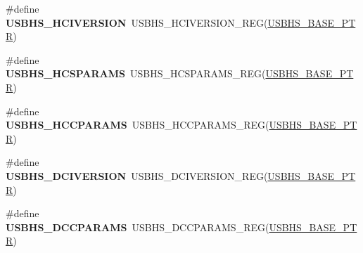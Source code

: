 \begin{DoxyCompactItemize}
\item 
\hypertarget{group___u_s_b_h_s___register___accessor___macros_ga67afc07e4a7744e0abad94d73dd6fe42}{}\#define {\bfseries U\+S\+B\+H\+S\+\_\+\+H\+C\+I\+V\+E\+R\+S\+I\+O\+N}~U\+S\+B\+H\+S\+\_\+\+H\+C\+I\+V\+E\+R\+S\+I\+O\+N\+\_\+\+R\+E\+G(\hyperlink{group___u_s_b_h_s___peripheral_gaa2bc10b8cd66f96acd39e15b3a581306}{U\+S\+B\+H\+S\+\_\+\+B\+A\+S\+E\+\_\+\+P\+T\+R})\label{group___u_s_b_h_s___register___accessor___macros_ga67afc07e4a7744e0abad94d73dd6fe42}

\item 
\hypertarget{group___u_s_b_h_s___register___accessor___macros_ga3e8dc34e06b4262bcc107bef2ee9ab3f}{}\#define {\bfseries U\+S\+B\+H\+S\+\_\+\+H\+C\+S\+P\+A\+R\+A\+M\+S}~U\+S\+B\+H\+S\+\_\+\+H\+C\+S\+P\+A\+R\+A\+M\+S\+\_\+\+R\+E\+G(\hyperlink{group___u_s_b_h_s___peripheral_gaa2bc10b8cd66f96acd39e15b3a581306}{U\+S\+B\+H\+S\+\_\+\+B\+A\+S\+E\+\_\+\+P\+T\+R})\label{group___u_s_b_h_s___register___accessor___macros_ga3e8dc34e06b4262bcc107bef2ee9ab3f}

\item 
\hypertarget{group___u_s_b_h_s___register___accessor___macros_ga75586689e38df7b77c44183c4310df6f}{}\#define {\bfseries U\+S\+B\+H\+S\+\_\+\+H\+C\+C\+P\+A\+R\+A\+M\+S}~U\+S\+B\+H\+S\+\_\+\+H\+C\+C\+P\+A\+R\+A\+M\+S\+\_\+\+R\+E\+G(\hyperlink{group___u_s_b_h_s___peripheral_gaa2bc10b8cd66f96acd39e15b3a581306}{U\+S\+B\+H\+S\+\_\+\+B\+A\+S\+E\+\_\+\+P\+T\+R})\label{group___u_s_b_h_s___register___accessor___macros_ga75586689e38df7b77c44183c4310df6f}

\item 
\hypertarget{group___u_s_b_h_s___register___accessor___macros_ga0546c9cf8dbc61190d4bcd043493be15}{}\#define {\bfseries U\+S\+B\+H\+S\+\_\+\+D\+C\+I\+V\+E\+R\+S\+I\+O\+N}~U\+S\+B\+H\+S\+\_\+\+D\+C\+I\+V\+E\+R\+S\+I\+O\+N\+\_\+\+R\+E\+G(\hyperlink{group___u_s_b_h_s___peripheral_gaa2bc10b8cd66f96acd39e15b3a581306}{U\+S\+B\+H\+S\+\_\+\+B\+A\+S\+E\+\_\+\+P\+T\+R})\label{group___u_s_b_h_s___register___accessor___macros_ga0546c9cf8dbc61190d4bcd043493be15}

\item 
\hypertarget{group___u_s_b_h_s___register___accessor___macros_gae0b153b9bdb2f1b94e81ac6a7b604faa}{}\#define {\bfseries U\+S\+B\+H\+S\+\_\+\+D\+C\+C\+P\+A\+R\+A\+M\+S}~U\+S\+B\+H\+S\+\_\+\+D\+C\+C\+P\+A\+R\+A\+M\+S\+\_\+\+R\+E\+G(\hyperlink{group___u_s_b_h_s___peripheral_gaa2bc10b8cd66f96acd39e15b3a581306}{U\+S\+B\+H\+S\+\_\+\+B\+A\+S\+E\+\_\+\+P\+T\+R})\label{group___u_s_b_h_s___register___accessor___macros_gae0b153b9bdb2f1b94e81ac6a7b604faa}


\end{DoxyCompactItemize}
